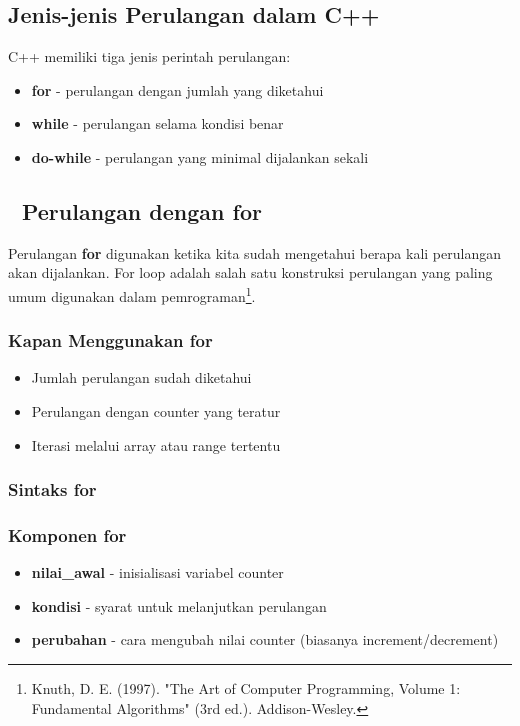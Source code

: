 \subsection{Jenis-jenis Perulangan dalam C++}

C++ memiliki tiga jenis perintah perulangan:
\begin{itemize}
\item \textbf{for} - perulangan dengan jumlah yang diketahui
\item \textbf{while} - perulangan selama kondisi benar
\item \textbf{do-while} - perulangan yang minimal dijalankan sekali
\end{itemize}

\subsection{🔄 Perulangan dengan for}\label{perulangan-dengan-for}

Perulangan \textbf{for} digunakan ketika kita sudah mengetahui berapa kali perulangan akan dijalankan. For loop adalah salah satu konstruksi perulangan yang paling umum digunakan dalam pemrograman\footnote{Knuth, D. E. (1997). "The Art of Computer Programming, Volume 1: Fundamental Algorithms" (3rd ed.). Addison-Wesley.}.

\subsubsection{Kapan Menggunakan for}

\begin{itemize}
\item Jumlah perulangan sudah diketahui
\item Perulangan dengan counter yang teratur
\item Iterasi melalui array atau range tertentu
\end{itemize}

\subsubsection{Sintaks for}



\subsubsection{Komponen for}

\begin{itemize}
\item \textbf{nilai\_awal} - inisialisasi variabel counter
\item \textbf{kondisi} - syarat untuk melanjutkan perulangan
\item \textbf{perubahan} - cara mengubah nilai counter (biasanya increment/decrement)
\end{itemize}

